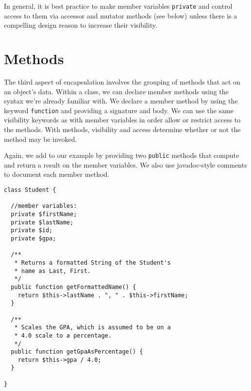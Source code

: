 In general, it is best practice to make member variables 
\texttt{private} and control access to them via accessor and
mutator methods (see below) unless there is a compelling design
reason to increase their visibility.

\section{Methods}

The third aspect of encapsulation involves the grouping of methods that
act on an object's data.  Within a class, we can declare member methods
using the syntax we're already familiar with.  We declare a member
method by using the keyword \texttt{function} and providing a signature and body.  We can use the same visibility
keywords as with member variables in order allow or restrict access
to the methods.  With methods, visibility and access determine whether 
or not the method may be invoked.


Again, we add to our example by providing two \texttt{public}
methods that compute and return a result on the member variables.  
We also use javadoc-style comments to document each member method.

\begin{verbatim}
class Student {

  //member variables:
  private $firstName;
  private $lastName;
  private $id;
  private $gpa;

  /**
   * Returns a formatted String of the Student's
   * name as Last, First.
   */
  public function getFormattedName() {
    return $this->lastName . ", " . $this->firstName;
  }
  
  /**
   * Scales the GPA, which is assumed to be on a
   * 4.0 scale to a percentage.
   */
  public function getGpaAsPercentage() {
    return $this->gpa / 4.0;
  }
  
}
\end{verbatim}

